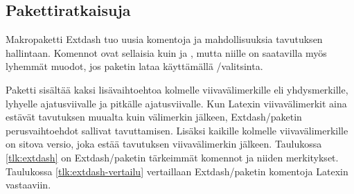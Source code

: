 \subsection{Pakettiratkaisuja}

Makropaketti Extdash tuo uusia komentoja ja mahdollisuuksia tavutuksen
hallintaan. Komennot ovat sellaisia kuin  ja
, mutta niille on saatavilla myös lyhemmät muodot,
jos paketin lataa käyttämällä \-/valitsinta.

\begin{koodilohkosis}
  \usepackage[shortcuts]{extdash}
\end{koodilohkosis}

Paketti sisältää kaksi lisä\-vaihto\-ehtoa kolmelle viivavälimerkille
eli yhdysmerkille, lyhyelle ajatusviivalle ja pitkälle ajatusviivalle.
Kun Latexin viivavälimerkit aina estävät tavutuksen muualta kuin
välimerkin jälkeen, Extdash\-/paketin perus\-vaihto\-ehdot sallivat
tavuttamisen. Lisäksi kaikille kolmelle viivavälimerkille on sitova
versio, joka estää tavutuksen viivavälimerkin jälkeen. Taulukossa
\ref{tlk:extdash} on Extdash\-/paketin tärkeimmät komennot ja niiden
merkitykset. Taulukossa \ref{tlk:extdash-vertailu} vertaillaan
Extdash\-/paketin komentoja Latexin vastaaviin.


